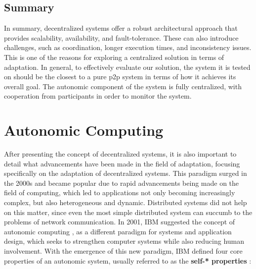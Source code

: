 \subsection{Summary} In summary, decentralized systems offer a robust architectural approach that provides scalability, availability, and fault-tolerance. These can also introduce challenges, such as coordination, longer execution times, and inconsistency issues. This is one of the reasons for exploring a centralized solution in terms of adaptation. In general, to effectively evaluate our solution, the system it is tested on should be the closest to a pure \gls{p2p} system in terms of how it achieves its overall goal. The autonomic component of the system is fully centralized, with cooperation from participants in order to monitor the system.
%                                                     
\section{Autonomic Computing}
\label{sec:autonomiccomputing}

After presenting the concept of decentralized systems, it is also important to detail what advancements have been made in the field of adaptation, focusing specifically on the adaptation of decentralized systems. This paradigm surged in the 2000s and became popular due to rapid advancements being made on the field of computing, which led to applications not only becoming increasingly complex, but also heterogeneous and dynamic. Distributed systems did not help on this matter, since even the most simple distributed system can succumb to the problems of network communication. In 2001, IBM suggested the concept of autonomic computing \cite{Horn2001}, as a different paradigm for systems and application design, which seeks to strengthen computer systems while also reducing human involvement. With the emergence of this new paradigm, IBM defined four core properties of an autonomic system, usually referred to as the \textbf{self-* properties} \cite{Huebscher2008}:

